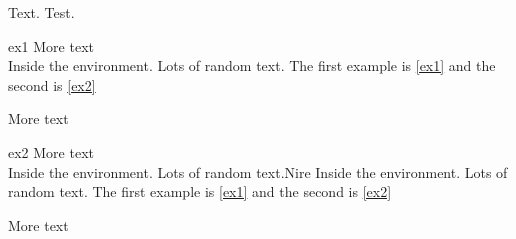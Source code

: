 \documentclass{book}
\begin{document}
\drawexamplemarks

Text. Test.\\


\begin{example}{ex1} More text\\

\noindent Inside the environment. Lots of random text. The first example is \ref{ex1} and the second is \ref{ex2}
\end{example}

More text
\nodrawexamplemarks

\begin{example}{ex2} More text\\

\noindent Inside the environment. Lots of random text.\clearpage Nire Inside the environment. Lots of random text. The first example is \ref{ex1} and the second is \ref{ex2}
\end{example}

More text
\end{document}
